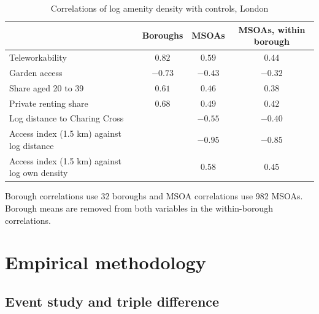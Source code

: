 \documentclass[11pt,a4paper]{article}
\newcommand{\tabnote}[1]{\par\smallskip\parbox{\linewidth}{\footnotesize #1}}
\begin{document}
\begin{table}[htbp]
\centering
\caption{Correlations of log amenity density with controls, London}\label{tab:corr}
\small
\begin{tabularx}{\linewidth}{@{}Lccc@{}}
\toprule
 & Boroughs & MSOAs & MSOAs, within borough \\
\midrule
Teleworkability & $0.82$ & $0.59$ & $0.44$ \\
Garden access & $-0.73$ & $-0.43$ & $-0.32$ \\
Share aged 20 to 39 & $0.61$ & $0.46$ & $0.38$ \\
Private renting share & $0.68$ & $0.49$ & $0.42$ \\
Log distance to Charing Cross & & $-0.55$ & $-0.40$ \\
\midrule
Access index (1.5 km) against log distance & & $-0.95$ & $-0.85$ \\
Access index (1.5 km) against log own density & & $0.58$ & $0.45$ \\
\bottomrule
\end{tabularx}
\tabnote{Borough correlations use 32 boroughs and MSOA correlations use 982 MSOAs. Borough means are removed from both variables in the within-borough correlations.}
\end{table}

\section{Empirical methodology}\label{sec:method}

\subsection{Event study and triple difference}
\end{document}

